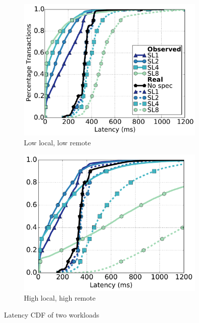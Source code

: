 \begin{figure}[t]
\centering

\begin{subfigure}[t]{0.49\linewidth}
\def\svgwidth{0.98\columnwidth}
\includegraphics[scale = 0.21]{figures/0lowlow}
\caption{\footnotesize Low local, low remote}
\label{fig:latency:a}
\end{subfigure}
\begin{subfigure}[t]{0.49\linewidth}
\def\svgwidth{0.98\columnwidth}
\includegraphics[scale = 0.21]{figures/0highhigh}
\caption{\footnotesize High local, high remote}
\label{fig:latency:b}
\end{subfigure}

\caption{Latency CDF of two workloads}
\label{fig:latency}
\end{figure}

